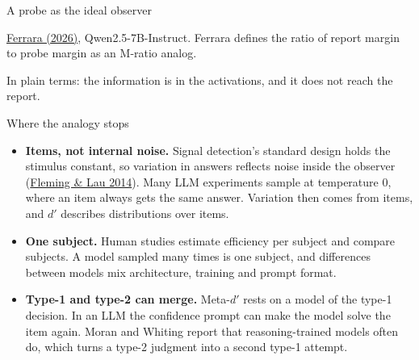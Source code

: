 \documentclass[aspectratio=169,11pt]{beamer}
\newcommand{\FL}{\href{https://www.frontiersin.org/articles/10.3389/fnhum.2014.00443/pdf}{Fleming \& Lau 2014}}
\newcommand{\site}{https://measuring-introspection.github.io/measuring-introspection}
\newcommand{\partslide}[2]{%
\begin{frame}[plain,label=#1]
\vfill
\begin{center}
  \setlength{\fboxrule}{2.5pt}%
  \fcolorbox{black}{white}{\parbox{0.65\textwidth}{\centering\vspace{0.8em}
    {\Large\bfseries #2}
  \vspace{0.8em}}}
\end{center}
\vfill
\end{frame}}
\begin{document}
\begin{frame}[label=probe]{A probe as the ideal observer}

\vspace{0.2em}
\begin{center}
\end{center}

\vspace{0.2em}
{\small \href{\site/papers/ferrara-2026/}{Ferrara (2026)}, Qwen2.5-7B-Instruct. Ferrara defines the ratio of report margin to probe margin as an M-ratio analog.}

\vspace{0.2em}
{\small In plain terms: the information is in the activations, and it does not reach the report.}
\end{frame}

\partslide{part5}{Part 5\\[0.5em]{\large\mdseries Limits}}

\begin{frame}[label=limits]{Where the analogy stops}
\begin{itemize}\setlength\itemsep{8pt}
  \item {\small \textbf{Items, not internal noise.} Signal detection's standard design holds the stimulus constant, so variation in answers reflects noise inside the observer (\FL). Many LLM experiments sample at temperature 0, where an item always gets the same answer. Variation then comes from items, and $d'$ describes distributions over items.}
  \item {\small \textbf{One subject.} Human studies estimate efficiency per subject and compare subjects. A model sampled many times is one subject, and differences between models mix architecture, training and prompt format.}
  \item {\small \textbf{Type-1 and type-2 can merge.} Meta-$d'$ rests on a model of the type-1 decision. In an LLM the confidence prompt can make the model solve the item again. Moran and Whiting report that reasoning-trained models often do, which turns a type-2 judgment into a second type-1 attempt.}
\end{itemize}
\end{frame}
\end{document}
